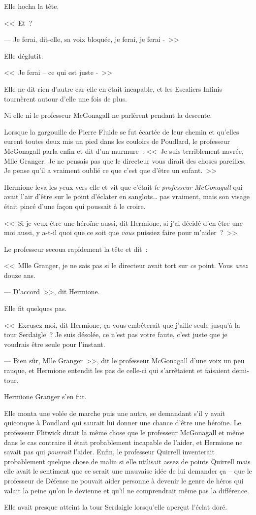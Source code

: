 Elle hocha la tête.

<<~Et~?

--- Je ferai, dit-elle, sa voix bloquée, je ferai, je ferai -~>>

Elle déglutit.

<<~Je ferai -- ce qui est juste -~>>

Elle ne dit rien d'autre car elle en était incapable, et les Escaliers Infinis tournèrent autour d'elle une fois de plus.

Ni elle ni le professeur McGonagall ne parlèrent pendant la descente.

Lorsque la gargouille de Pierre Fluide se fut écartée de leur chemin et qu'elles eurent toutes deux mis un pied dans les couloirs de Poudlard, le professeur McGonagall parla enfin et dit d'un murmure~: <<~Je suis terriblement navrée, Mlle Granger. Je ne pensais pas que le directeur vous dirait des choses pareilles. Je pense qu'il a vraiment oublié ce que c'est que d'être un enfant.~>>

Hermione leva les yeux vers elle et vit que c'était \emph{le professeur McGonagall} qui avait l'air d'être sur le point d'éclater en sanglots… pas vraiment, mais son visage était pincé d'une façon qui poussait à le croire.

<<~Si je veux être une héroïne aussi, dit Hermione, si j'ai décidé d'en être une moi aussi, y a-t-il quoi que ce soit que \emph{vous} puissiez faire pour m'aider~?~>>

Le professeur secoua rapidement la tête et dit~:

<<~Mlle Granger, je ne sais pas si le directeur avait tort sur \emph{ce} point. Vous \emph{avez} douze ans.

--- D'accord~>>, dit Hermione.

Elle fit quelques pas.

<<~Excusez-moi, dit Hermione, ça vous embêterait que j'aille seule jusqu'à la tour Serdaigle~? Je suis désolée, ce n'est pas votre faute, c'est juste que je voudrais être seule pour l'instant.

--- Bien sûr, Mlle Granger~>>, dit le professeur McGonagall d'une voix un peu rauque, et Hermione entendit les pas de celle-ci qui s'arrêtaient et faisaient demi-tour.

Hermione Granger s'en fut.

Elle monta une volée de marche puis une autre, se demandant s'il y avait quiconque à Poudlard qui saurait lui donner une chance d'être une héroïne. Le professeur Flitwick dirait la même chose que le professeur McGonagall et même dans le cas contraire il était probablement incapable de l'aider, et Hermione ne savait pas qui \emph{pourrait} l'aider. Enfin, le professeur Quirrell inventerait probablement quelque chose de malin si elle utilisait assez de points Quirrell mais elle avait le sentiment que ce serait une mauvaise idée de lui demander ça -- que le professeur de Défense ne pouvait aider personne à devenir le genre de héros qui valait la peine qu'on le devienne et qu'il ne comprendrait même pas la différence.

Elle avait presque atteint la tour Serdaigle lorsqu'elle aperçut l'éclat doré. 


